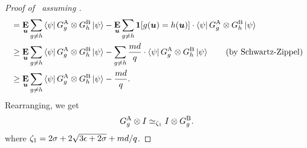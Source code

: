 \begin{proof}[Proof of~ assuming ]
\begin{align*}
& = \mathop{\bf E\/}_{\boldsymbol{u}} \sum_{g \neq h}  \bra{\psi} G^{\mathrm{A}}_{g} \otimes G^{\mathrm{B}}_{h} \ket{\psi}
	- \mathop{\bf E\/}_{\boldsymbol{u}} \sum_{g \neq h}  \boldsymbol{1}[g(\boldsymbol{u}) = h(\boldsymbol{u})] \cdot \bra{\psi} G^{\mathrm{A}}_{g} \otimes G^{\mathrm{B}}_{h} \ket{\psi}\\
& \geq \mathop{\bf E\/}_{\boldsymbol{u}} \sum_{g \neq h}  \bra{\psi} G^{\mathrm{A}}_{g} \otimes G^{\mathrm{B}}_{h} \ket{\psi}
	-  \sum_{g \neq h}  \frac{md}{q}\cdot \bra{\psi} G^{\mathrm{A}}_{g} \otimes G^{\mathrm{B}}_{h} \ket{\psi} \tag{by Schwartz-Zippel}\\
& \geq \mathop{\bf E\/}_{\boldsymbol{u}} \sum_{g \neq h}  \bra{\psi} G^{\mathrm{A}}_{g} \otimes G^{\mathrm{B}}_{h} \ket{\psi} - \frac{md}{q}.
\end{align*}
Rearranging, we get
\begin{equation}\label{eq:G-self-consistency}
G^{\mathrm{A}}_g \otimes I \simeq_{\zeta_1} I \otimes G^{\mathrm{B}}_g.
\end{equation}
where $\zeta_1 = 2\sigma + 2\sqrt{3\epsilon + 2\sigma} + md/q$.


\end{proof}
